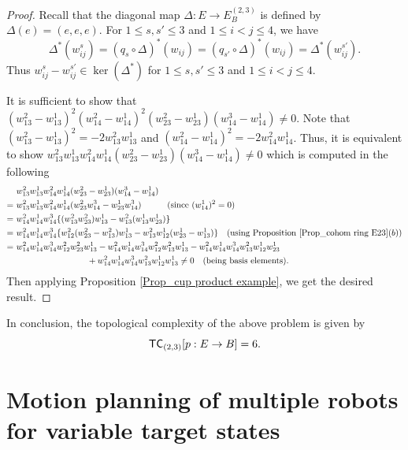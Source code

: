 \documentclass[12pt,oneside,reqno]{amsart}
\theoremstyle{plain}
\theoremstyle{definition}
\theoremstyle{remark}
\newcommand{\sect}{\setcounter{figure}{0}\section}
\newcommand{\TC}{{\sf {TC}}}
\begin{document}
\begin{proof}
Recall that the diagonal map $\Delta : E \to E^{(2, 3)}_B$ is defined by $\Delta(e)= (e, e, e)$. For $1\leq s,s'\leq 3$ and $1\leq i < j \leq 4$, we have $$\Delta^*(w^s_{ij}) = (q_s\circ \Delta)^*(w_{ij}) = (q_{s'}\circ \Delta)^*(w_{ij}) = \Delta^*(w^{s'}_{ij}).$$
Thus $w^s_{ij} - w^{s'}_{ij}\in \ker(\Delta^*)$ for $1\leq s,s'\leq 3$ and $1\leq i < j \leq 4$. 

It is sufficient to show that $(w^2_{13}-w^1_{13})^2(w^2_{14}-w^1_{14})^2(w^2_{23}-w^1_{23})(w^3_{14}-w^1_{14})\neq 0.$ Note that $(w^2_{13}-w^1_{13})^2 = -2 w^2_{13} w^1_{13}$
and $(w^2_{14}-w^1_{14})^2 = -2 w^2_{14} w^1_{14}$. Thus, it is equivalent to show $w^2_{13}w^1_{13}w^2_{14}w^1_{14}(w^2_{23}-w^1_{23})(w^3_{14}-w^1_{14})\neq 0$ which is computed in the following
\begin{align*}
&~w^2_{13}w^1_{13}w^2_{14}w^1_{14}(w^2_{23}-w^1_{23})(w^3_{14}-w^1_{14}) 
\\= &~ w^2_{13}w^1_{13}w^2_{14}w^1_{14}(w^2_{23}w^3_{14}-w^1_{23}w^3_{14}) \quad \quad \quad (\text{since~} (w^1_{14})^2=0)
\\= &~ w^2_{14}w^1_{14}w^3_{14} \{ (w^2_{13}w^2_{23})w^1_{13} - w^2_{13}(w^1_{13}w^1_{23}) \}
\\= &~ w^2_{14}w^1_{14}w^3_{14} \{ w^2_{12}(w^2_{23}-w^2_{13})w^1_{13}-w^2_{13}w^1_{12}(w^1_{23}-w^1_{13}) \} \quad (\text{using Proposition } \ref{Prop_cohom ring E23}(b))
\\= & ~ w^2_{14}w^1_{14}w^3_{14} w^2_{12}w^2_{23}w^1_{13}-
 w^2_{14}w^1_{14}w^3_{14} w^2_{12}w^2_{13}w^1_{13}-
  w^2_{14}w^1_{14}w^3_{14} w^2_{13}w^1_{12}w^1_{23}
   \\& \hspace{3cm} +w^2_{14}w^1_{14}w^3_{14} w^2_{13}w^1_{12}w^1_{13}
 \neq 0 \quad (\text{being basis elements}).
\end{align*} 
Then applying Proposition \ref{Prop_cup product example}, we get the desired result.
\end{proof}

\noindent In conclusion, the topological complexity of the above problem is given by $$\TC_{(2, 3)}[p: E \to B] = 6.$$



\sect{Motion planning of multiple robots for variable target states}\label{sec: variable target}
\end{document}

